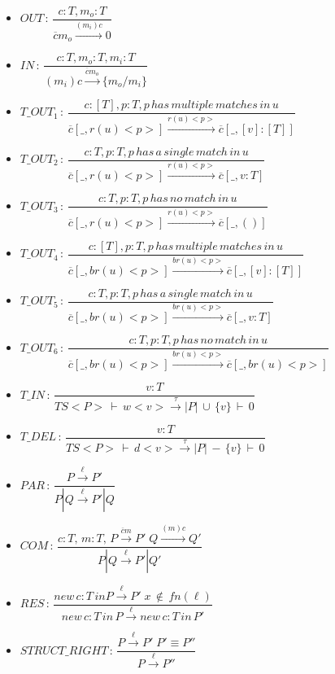 \begin{itemize}
  \item $OUT\,:\,\dfrac{c:T,m_o:T}{\overline{c}m_o \stackrel{(m_i)c}{\longrightarrow} 0}$
  \item $IN\,:\,\dfrac{c:T,m_o:T,m_i:T}{(m_i)c \stackrel{\overline{c}m_o}{\longrightarrow} \{ m_o/m_i \}}$
  \item $T\_OUT_1\,:\,\dfrac{c:[T],p:T,p\,has\,multiple\,matches\,in\,u}{\overline{c}[\_,r(u)<p>] \stackrel{r(u)<p>}{\longrightarrow} \overline{c}[\_,[v]:[T]]}$
  \item $T\_OUT_2\,:\,\dfrac{c:T,p:T,p\,has\,a\,single\,match\,in\,u}{\overline{c}[\_,r(u)<p>] \stackrel{r(u)<p>}{\longrightarrow} \overline{c}[\_,v:T]}$
  \item $T\_OUT_3\,:\,\dfrac{c:T,p:T,p\,has\,no\,match\,in\,u}{\overline{c}[\_,r(u)<p>] \stackrel{r(u)<p>}{\longrightarrow} \overline{c}[\_,()]}$
  \item $T\_OUT_4\,:\,\dfrac{c:[T],p:T,p\,has\,multiple\,matches\,in\,u}{\overline{c}[\_,br(u)<p>] \stackrel{br(u)<p>}{\longrightarrow} \overline{c}[\_,[v]:[T]]}$
  \item $T\_OUT_5\,:\,\dfrac{c:T,p:T,p\,has\,a\,single\,match\,in\,u}{\overline{c}[\_,br(u)<p>] \stackrel{br(u)<p>}{\longrightarrow} \overline{c}[\_,v:T]}$
  \item $T\_OUT_6\,:\,\dfrac{c:T,p:T,p\,has\,no\,match\,in\,u}{\overline{c}[\_,br(u)<p>] \stackrel{br(u)<p>}{\longrightarrow} \overline{c}[\_,br(u)<p>]}$
  \item $T\_IN\,:\,\dfrac{v:T}{TS<P>\,\vdash\, w<v> \stackrel{\tau}{\longrightarrow} |P| \, \cup \, \{ v \}\,\vdash\, 0}$
  \item $T\_DEL\,:\,\dfrac{v:T}{TS<P>\,\vdash\, d<v> \stackrel{\tau}{\longrightarrow} |P| \, - \, \{ v \}\,\vdash\, 0}$
  \item $PAR\,:\,\dfrac{P \stackrel{\ell}{\rightarrow} P'}{P|Q\stackrel{\ell}{\rightarrow}P'|Q}$
  \item $COM\,:\,\dfrac{c:T,\,m:T,\,P \stackrel{\overline{c}m}{\rightarrow} P'\; Q \stackrel{(m)c}{\rightarrow} Q'}{P|Q\stackrel{\ell}{\rightarrow}P'|Q'}$
  \item $RES\,:\,\dfrac{new\,c:T\,in P \stackrel{\ell}{\rightarrow} P'\; x\,\notin\,fn(\ell)}{new\,c:T\,in\,P\stackrel{\ell}{\rightarrow}new\,c:T\,in\,P'}$
  \item $STRUCT\_RIGHT\,:\,\dfrac{P \stackrel{\ell}{\rightarrow} P'\; P' \equiv P''}{P\stackrel{\ell}{\rightarrow}P''}$
\end{itemize}

